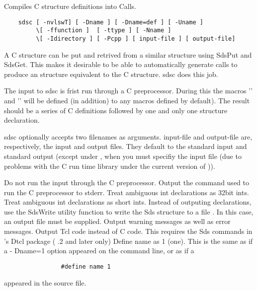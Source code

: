 \begin{manroutinedescription}
      Compiles C structure definitions into {} Calls.

\begin{verbatim}
    sdsc [ -nvlswT] [ -Dname ] [ -Dname=def ] [ -Uname ]
         \[ -ffunction ]  [ -ttype ] [ -Nname ]
         \[ -Idirectory ] [ -Pcpp ] [ input-file ] [ output-file]
\end{verbatim}
 	A C structure can be put and retrived from a similar {}
	structure using SdsPut and SdsGet.  This makes it desirable to be
	able to automatically generate {} calls to produce an {}
	structure equivalent to the C structure.  sdsc does this job.

	The input to sdsc is frist run through a C preprocessor.  During
	this the macros '{}' and '{}' %
will be defined (in addition)
	to any macros defined by default).   The result should be a series
	of C definitions followed by one and only one structure declaration.

      sdsc optionally accepts two filenames as arguments.  input-file and
	output-file are, respectively, the input and output files.  They
	default to the standard input and standard output (except under {},
	when you must specifiy the input file (due to problems with the C
	run time library under the current version of {})).

\begin{mandescription}
Do not run the input through the C preprocessor.
Output the command used to run the  C preprocessor to %
stderr.
Treat ambiguous int declarations as 32bit ints.
Treat ambiguous int declarations as short ints.
Instead of outputing declarations, use the SdsWrite
		utility function to write the Sds structure to a file .
		In this case, an output file must be supplied.
Output warning messages as well as error %
messages.
Output Tcl code instead of C code.  This %
requires the Sds
              commands in {}'s Dtcl package ({} {%
}.2 and later only)
Define name as 1 (one).  This is the same as if a -%
Dname=1
		option appeared on the command line, or as if a
\begin{verbatim}
                #define name 1
\end{verbatim}		appeared in the source file.


\end{mandescription}
\end{manroutinedescription}
